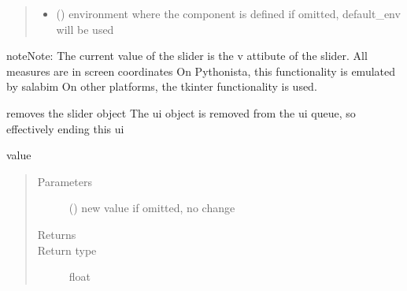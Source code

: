 \documentclass[letterpaper,10pt,english]{sphinxmanual}
\begin{document}
\begin{fulllineitems}
\begin{quote}
\begin{description}
\begin{itemize}
\item {} 
 ({\hyperref[\detokenize{Reference:salabim.Environment}]{}}) \textendash{} environment where the component is defined 
if omitted, default\_env will be used

\end{itemize}

\end{description}\end{quote}

\begin{sphinxadmonition}{note}{Note:}
The current value of the slider is the v attibute of the slider. 
All measures are in screen coordinates 
On Pythonista, this functionality is emulated by salabim
On other platforms, the tkinter functionality is used.
\end{sphinxadmonition}

\begin{fulllineitems}
\label{\detokenize{Reference:salabim.AnimateSlider.remove}}
removes the slider object 
The ui object is removed from the ui queue,
so effectively ending this ui

\end{fulllineitems}


\begin{fulllineitems}
\label{\detokenize{Reference:salabim.AnimateSlider.v}}
value
\begin{quote}\begin{description}
\item[{Parameters}] \leavevmode
{} () \textendash{} new value 
if omitted, no change

\item[{Returns}] \leavevmode
{}

\item[{Return type}] \leavevmode
float

\end{description}\end{quote}

\end{fulllineitems}


\end{fulllineitems}
\end{document}
